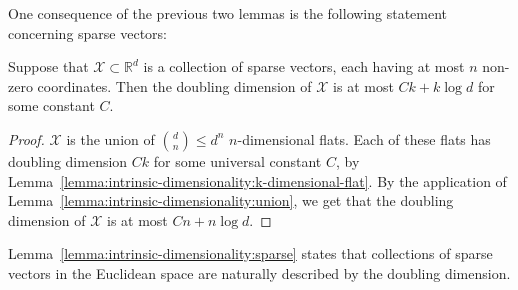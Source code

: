 One consequence of the previous two lemmas is the following statement concerning sparse
vectors:

\begin{lemma}
    \label{lemma:intrinsic-dimensionality:sparse}
    Suppose that $\mathcal{X} \subset \mathbb{R}^d$ is a collection of sparse vectors,
    each having at most $n$ non-zero coordinates. Then the doubling dimension of $\mathcal{X}$
    is at most $Ck + k \log d$ for some constant $C$.
\end{lemma}
\begin{proof}
    $\mathcal{X}$ is the union of $\binom{d}{n} \leq d^n$ $n$-dimensional flats.
    Each of these flats has doubling dimension $Ck$ for some universal constant $C$,
    by Lemma~\ref{lemma:intrinsic-dimensionality:k-dimensional-flat}.
    By the application of Lemma~\ref{lemma:intrinsic-dimensionality:union},
    we get that the doubling dimension of $\mathcal{X}$ is at most $Cn + n \log d$.
\end{proof}

\begin{svgraybox}
    Lemma~\ref{lemma:intrinsic-dimensionality:sparse} states that collections of
    sparse vectors in the Euclidean space are naturally described by the doubling dimension. 
\end{svgraybox}



